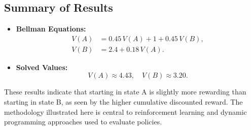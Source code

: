 \documentclass[11pt]{article}
\begin{document}
\subsection*{Summary of Results}

\begin{itemize}
    \item \textbf{Bellman Equations:}
    \[
    \begin{aligned}
    V(A) &= 0.45\, V(A) + 1 + 0.45\, V(B),\\[1mm]
    V(B) &= 2.4 + 0.18\, V(A).
    \end{aligned}
    \]
    \item \textbf{Solved Values:}
    \[
    V(A) \approx 4.43, \quad V(B) \approx 3.20.
    \]
\end{itemize}

These results indicate that starting in state A is slightly more rewarding than starting in state B, as seen by the higher cumulative discounted reward. The methodology illustrated here is central to reinforcement learning and dynamic programming approaches used to evaluate policies.
\end{document}
